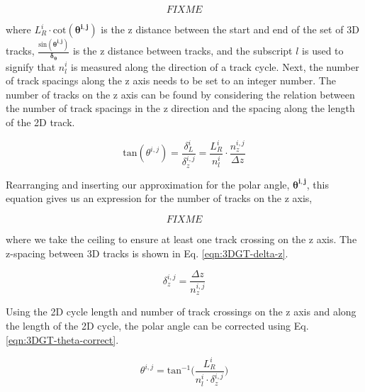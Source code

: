\begin{equation}
FIXME
\label{eqn:3DGT-nl}
\end{equation}

\noindent
where $L_R^i \cdot \text{cot} (\boldsymbol{\theta^{i,j}})$ is the z distance between the start and end of the set of 3D tracks, $\frac{\text{sin} (\boldsymbol{\theta^{i,j}})}{\boldsymbol{\delta_{\theta}}}$ is the z distance between tracks, and the subscript $l$ is used to signify that $n_l^i$ is measured along the direction of a track cycle. Next, the number of track spacings along the z axis needs to be set to an integer number. The number of tracks on the z axis can be found by considering the relation between the number of track spacings in the z direction and the spacing along the length of the 2D track.

\begin{equation}
\text{tan} (\theta^{i,j}) = \frac{\delta_L^i}{\delta_z^{i,j}} = \frac{L_R^i}{n_l^i} \cdot \frac{n_z^{i,j}}{\Delta z}
\end{equation}

\noindent
Rearranging and inserting our approximation for the polar angle, $\boldsymbol{\theta^{i,j}}$, this equation gives us an expression for the number of tracks on the z axis,

\begin{equation}
FIXME
\label{eqn:3DGT-nz}
\end{equation}

\noindent
where we take the ceiling to ensure at least one track crossing on the z axis. The z-spacing between 3D tracks is shown in Eq. \ref{eqn:3DGT-delta-z}.

\begin{equation}
\delta_z^{i,j} = \frac{\Delta z}{n_z^{i,j}}
\label{eqn:3DGT-delta-z}
\end{equation}

\noindent
Using the 2D cycle length and number of track crossings on the z axis and along the length of the 2D cycle, the polar angle can be corrected using Eq. \ref{eqn:3DGT-theta-correct}.

\begin{equation}
\theta^{i,j} = \text{tan}^{-1} \bigg( \frac{L_R^i}{n_l^i \cdot \delta_z^{i,j}}\bigg)
\label{eqn:3DGT-theta-correct}
\end{equation}

